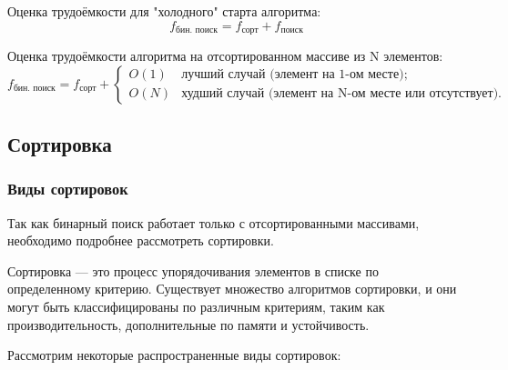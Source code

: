 Оценка трудоёмкости для "холодного" старта алгоритма:
\[f_{\text{бин. поиск}} = f_{\text{сорт}} + f_{\text{поиск}}\]

Оценка трудоёмкости алгоритма на отсортированном массиве из N элементов:
\begin{equation}
    f_{\text{бин. поиск}} = f_{\text{сорт}} + 
    \begin{cases}
      O(1) & \text{лучший случай (элемент на 1-ом месте)}; \\
      O(N) & \text{худший случай (элемент на N-ом месте или отсутствует)}.
    \end{cases}
\end{equation}

\subsection{Сортировка}

\subsubsection*{Виды сортировок}

\hspace{1.25cm}
Так как бинарный поиск работает только с отсортированными массивами, необходимо подробнее рассмотреть сортировки.

Сортировка — это процесс упорядочивания элементов в списке по определенному критерию. Существует множество алгоритмов сортировки, и они могут быть классифицированы по различным критериям, таким как производительность, дополнительные по памяти и устойчивость.

Рассмотрим некоторые распространенные виды сортировок:

